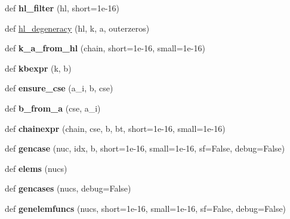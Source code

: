 \begin{DoxyCompactItemize}
\item 
\mbox{\label{namespacedecaygen_ac9ae4af195a6db5f9416051df0b6fb85}} 
def {\bfseries hl\+\_\+filter} (hl, short=1e-\/16)
\item 
def \hyperlink{namespacedecaygen_aa3770d9984327e626888d864436a894f}{hl\+\_\+degeneracy} (hl, k, a, outerzeros)
\item 
\mbox{\label{namespacedecaygen_aa2a0501a700e065a5f65e90e75cbe821}} 
def {\bfseries k\+\_\+a\+\_\+from\+\_\+hl} (chain, short=1e-\/16, small=1e-\/16)
\item 
\mbox{\label{namespacedecaygen_ae12456305bbca70051414091248b04f2}} 
def {\bfseries kbexpr} (k, b)
\item 
\mbox{\label{namespacedecaygen_a0672d52bd4f1ca8b41ae19fe4758fc8b}} 
def {\bfseries ensure\+\_\+cse} (a\+\_\+i, b, cse)
\item 
\mbox{\label{namespacedecaygen_add28ab2ef61e66bee845086c813c3a3b}} 
def {\bfseries b\+\_\+from\+\_\+a} (cse, a\+\_\+i)
\item 
\mbox{\label{namespacedecaygen_a626f5859ef773fcacce1d24a82461d01}} 
def {\bfseries chainexpr} (chain, cse, b, bt, short=1e-\/16, small=1e-\/16)
\item 
\mbox{\label{namespacedecaygen_aec4a39496e7809f2d6afab72fdfeac20}} 
def {\bfseries gencase} (nuc, idx, b, short=1e-\/16, small=1e-\/16, sf=\+False, debug=\+False)
\item 
\mbox{\label{namespacedecaygen_aefb80200c848f900af82ea7a957bd357}} 
def {\bfseries elems} (nucs)
\item 
\mbox{\label{namespacedecaygen_a495f4bcf9d65b044ef327fb16e229154}} 
def {\bfseries gencases} (nucs, debug=False)
\item 
\mbox{\label{namespacedecaygen_a8d2fecb2ae393632f9e52ead062e5dda}} 
def {\bfseries genelemfuncs} (nucs, short=1e-\/16, small=1e-\/16, sf=\+False, debug=\+False)
\item 

\end{DoxyCompactItemize}
